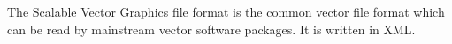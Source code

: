 \documentclass[12pt,letterpaper]{article}
\begin{document}
The Scalable Vector Graphics file format is the common vector file format which can be read by mainstream vector software packages. It is written in XML.

\newpage


\appendix
\listoffigures
\listoftables



\end{document}
